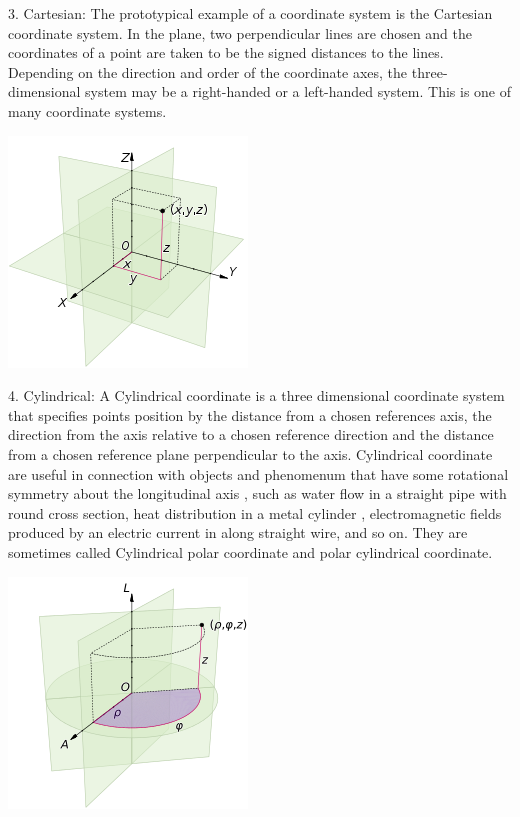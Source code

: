 \documentclass[a4paper, 12pt]{report}
\begin{document}
3. Cartesian:
The prototypical example of a coordinate system is the Cartesian coordinate system. In the plane, two perpendicular lines are chosen and the coordinates of a point are taken to be the signed distances to the lines.
Depending on the direction and order of the coordinate axes, the three-dimensional system may be a right-handed or a left-handed system. This is one of many coordinate systems.\\
\begin{center}
	\includegraphics[]{cart.png}
\end{center}


4. Cylindrical:
A Cylindrical coordinate is a three dimensional coordinate system that specifies points position by the distance from a chosen references axis, the direction from the axis relative to a chosen reference direction and the distance from a chosen reference plane perpendicular to the axis.
Cylindrical coordinate are useful in connection with objects and phenomenum that have some rotational symmetry about the longitudinal axis , such as water flow in a straight pipe with round cross section, heat distribution in a metal cylinder , electromagnetic fields produced by an electric current in along straight wire, and so on. They are sometimes called Cylindrical polar coordinate and polar cylindrical coordinate.
\begin{center}
	\includegraphics[]{cylindrical.png}
\end{center}
\end{document}
